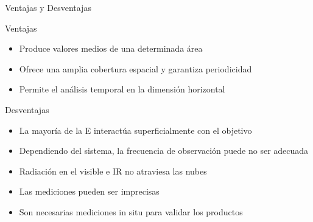 \documentclass[
  ignorenonframetext,
]{beamer}
\providecommand{\tightlist}{%
  \setlength{\itemsep}{0pt}\setlength{\parskip}{0pt}}
\begin{document}
\begin{frame}{Ventajas y Desventajas}
\protect\hypertarget{ventajas-y-desventajas}{}
\begin{block}{Ventajas}
\protect\hypertarget{ventajas}{}
\begin{itemize}
\tightlist
\item
  Produce valores medios de una determinada área
\item
  Ofrece una amplia cobertura espacial y garantiza periodicidad
\item
  Permite el análisis temporal en la dimensión horizontal
\end{itemize}
\end{block}

\begin{block}{Desventajas}
\protect\hypertarget{desventajas}{}
\begin{itemize}
\tightlist
\item
  La mayoría de la E interactúa superficialmente con el objetivo
\item
  Dependiendo del sistema, la frecuencia de observación puede no ser
  adecuada
\item
  Radiación en el visible e IR no atraviesa las nubes
\item
  Las mediciones pueden ser imprecisas
\item
  Son necesarias mediciones in situ para validar los productos
\end{itemize}
\end{block}
\end{frame}
\end{document}
